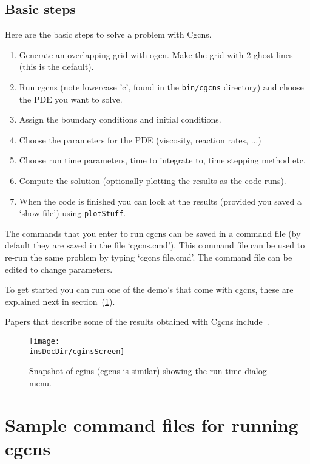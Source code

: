 \documentclass{article}
\newcommand{\Index}[1]{#1\index{#1}}
\newcommand{\insDocDir}{\homeHenshaw/cgDoc/ins}
\begin{document}
\subsection{Basic steps}
Here are the basic steps to solve a problem with Cgcns.
\begin{enumerate}
  \item Generate an overlapping grid with ogen. Make the grid with 2 ghost lines (this is the default).
  \item Run cgcns (note lowercase 'c', found in the {\tt bin/cgcns} directory) 
        and choose the PDE you want to solve.
  \item Assign the boundary conditions and initial conditions.
  \item Choose the parameters for the PDE (viscosity, reaction rates, ...)
  \item Choose run time parameters, time to integrate to, time stepping method etc.
  \item Compute the solution (optionally plotting the results as the code runs).
  \item When the code is finished you can look at the results (provided you saved a
     `show file') using {\tt plotStuff}.
\end{enumerate}
The commands that you enter to run cgcns can be saved in a \Index{command file} (by default
they are saved in the file `cgcns.cmd'). This command file can be used to re-run
the same problem by typing `cgcns file.cmd'. The command file can be edited to change parameters.

To get started you can run one of the demo's that come with cgcns, these are 
explained next in section~(\ref{sec:demo}).

Papers that describe some of the results obtained with Cgcns include~\cite{pog2008,mog2006,reactamr2003b}. 
  
\begin{figure}[hbt]
\begin{center}
  \texttt{[image: \\insDocDir/cginsScreen]} \\
  \caption{Snapshot of cgins (cgcns is similar) showing the run time dialog menu.}
  \end{center} 
  \label{fig:runTimeScreen}
\end{figure}



\clearpage
\section{Sample command files for running cgcns} \label{sec:demo}
\end{document}
